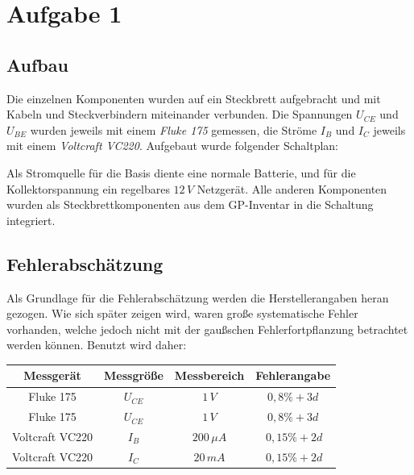 \newpage
\section{Aufgabe 1}
\subsection{Aufbau}
Die einzelnen Komponenten wurden auf ein Steckbrett aufgebracht und mit Kabeln und Steckverbindern miteinander verbunden. Die Spannungen \(U_{CE}\) und \(U_{BE}\) wurden jeweils mit einem  {\it Fluke 175} gemessen, die Ströme \(I_B\) und \(I_C\) jeweils mit einem  {\it Voltcraft VC220}. Aufgebaut wurde folgender Schaltplan:
\begin{center}
\begin{minipage}{\linewidth}
\centering
{}
%
\label{Schaltplan1}
\end{minipage}
\end{center}
Als Stromquelle für die Basis diente eine normale Batterie, und für die Kollektorspannung ein regelbares \(12\, V\) Netzgerät. Alle anderen Komponenten wurden als Steckbrettkomponenten aus dem GP-Inventar in die Schaltung integriert.

\subsection{Fehlerabschätzung}
Als Grundlage für die Fehlerabschätzung werden die Herstellerangaben heran gezogen. Wie sich später zeigen wird, waren große systematische Fehler vorhanden, welche jedoch nicht mit der gaußschen Fehlerfortpflanzung betrachtet werden können. Benutzt wird daher: 
\begin{center}
\begin{tabular}{c|c|c|c}
Messgerät & Messgröße & Messbereich & Fehlerangabe \\\hline
Fluke 175 & \(U_{CE}\) & \(1\, V\) & \(0,8\% +3d\) \\
Fluke 175 & \(U_{CE}\) & \(1\, V\) & \(0,8\% +3d\) \\
Voltcraft VC220 & \(I_{B}\) & \(200 \, \mu A \) & \(\ 0,15\% +2d\) \\
Voltcraft VC220 & \(I_{C}\) & \(20 \, mA \) & \(\ 0,15\% +2d\)
\end{tabular}
\end{center}

